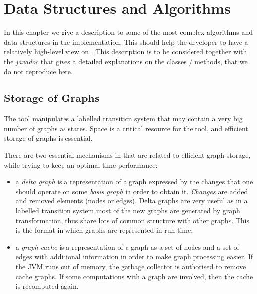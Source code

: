 \chapter{Data Structures and Algorithms}

In this chapter we give a description to some of the most complex
algorithms and data structures in the \GROOVE implementation. This should
help the developer to have a relatively high-level view on \GROOVE. This
description is to be considered together with the {\em javadoc} that gives
a detailed explanations on the classes / methods, that we do not reproduce
here.

\section{Storage of Graphs}

The tool \GROOVE manipulates a labelled transition system that may contain
a very big number of graphs as states. Space is a critical resource for the
tool, and efficient storage of graphs is essential.

There are two essential mechanisms in \GROOVE that are related to efficient
graph storage, while trying to keep an optimal time performance:
\begin{itemize}
\item a {\em delta graph} is a representation of a graph expressed by the
  changes that one should operate on some {\em basis graph} in order to
  obtain it. {\em Changes} are added and removed elements (nodes or edges).
  Delta graphs are very useful as in a labelled transition system most of
  the new graphs are generated by graph transformation, thus share lots of
  common structure with other graphs. This is the format in which graphs
  are represented in run-time;
\item a {\em graph cache} is a representation of a graph as a set of nodes
  and a set of edges with additional information in order to make graph
  processing easier. If the JVM runs out of memory, the garbage collector
  is authorised to remove cache graphs. If some computations with a graph
  are involved, then the cache is recomputed again.
\end{itemize}

